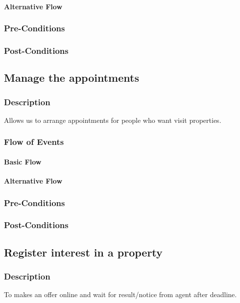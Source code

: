 \documentclass[a4paper,12pt]{article}
\begin{document}
\paragraph{Alternative Flow}
\begin{itemize}
\end{itemize}
\subsubsection{Pre-Conditions}
\subsubsection{Post-Conditions}

\subsection{Manage the appointments}
\subsubsection{Description}
Allows us to arrange appointments for people who want visit properties.
\subsubsection{Flow of Events}
\paragraph{Basic Flow}
\begin{itemize}
\end{itemize}
\paragraph{Alternative Flow}
\begin{itemize}
\end{itemize}
\subsubsection{Pre-Conditions}
\subsubsection{Post-Conditions}

\subsection{Register interest in a property}
\subsubsection{Description}
To makes an offer online and wait for result/notice from agent after deadline.
\end{document}
